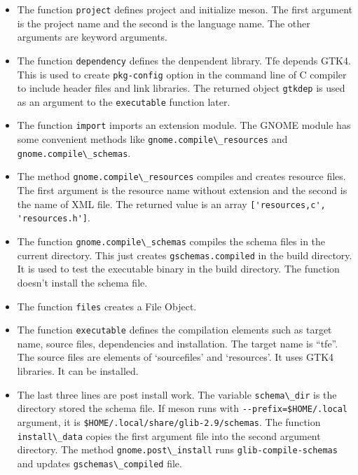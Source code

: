 \begin{itemize}
\tightlist
\item
  The function \passthrough{\lstinline!project!} defines project and
  initialize meson. The first argument is the project name and the
  second is the language name. The other arguments are keyword
  arguments.
\item
  The function \passthrough{\lstinline!dependency!} defines the
  denpendent library. Tfe depends GTK4. This is used to create
  \passthrough{\lstinline!pkg-config!} option in the command line of C
  compiler to include header files and link libraries. The returned
  object \passthrough{\lstinline!gtkdep!} is used as an argument to the
  \passthrough{\lstinline!executable!} function later.
\item
  The function \passthrough{\lstinline!import!} imports an extension
  module. The GNOME module has some convenient methods like
  \passthrough{\lstinline!gnome.compile\_resources!} and
  \passthrough{\lstinline!gnome.compile\_schemas!}.
\item
  The method \passthrough{\lstinline!gnome.compile\_resources!} compiles
  and creates resource files. The first argument is the resource name
  without extension and the second is the name of XML file. The returned
  value is an array
  \passthrough{\lstinline!['resources,c', 'resources.h']!}.
\item
  The function \passthrough{\lstinline!gnome.compile\_schemas!} compiles
  the schema files in the current directory. This just creates
  \passthrough{\lstinline!gschemas.compiled!} in the build directory. It
  is used to test the executable binary in the build directory. The
  function doesn't install the schema file.
\item
  The function \passthrough{\lstinline!files!} creates a File Object.
\item
  The function \passthrough{\lstinline!executable!} defines the
  compilation elements such as target name, source files, dependencies
  and installation. The target name is ``tfe''. The source files are
  elements of `sourcefiles' and `resources'. It uses GTK4 libraries. It
  can be installed.
\item
  The last three lines are post install work. The variable
  \passthrough{\lstinline!schema\_dir!} is the directory stored the
  schema file. If meson runs with
  \passthrough{\lstinline!--prefix=$HOME/.local!} argument, it is
  \passthrough{\lstinline!$HOME/.local/share/glib-2.9/schemas!}. The
  function \passthrough{\lstinline!install\_data!} copies the first
  argument file into the second argument directory. The method
  \passthrough{\lstinline!gnome.post\_install!} runs
  \passthrough{\lstinline!glib-compile-schemas!} and updates
  \passthrough{\lstinline!gschemas\_compiled!} file.
\end{itemize}

